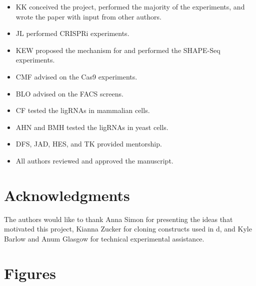 \documentclass[10pt,oneside]{article}
\begin{document}
\begin{itemize}
    \item KK conceived the project, performed the majority of the experiments, and wrote the paper with input from other authors.
    \item JL performed CRISPRi experiments.
    \item KEW proposed the mechanism for \ligrnaB{} and performed the SHAPE-Seq experiments.
    \item CMF advised on the \invitro{} Cas9 experiments.
    \item BLO advised on the FACS screens.
    \item CF tested the ligRNAs in mammalian cells.
    \item AHN and BMH tested the ligRNAs in yeast cells.
    \item DFS, JAD, HES, and TK provided mentorship.
	\item All authors reviewed and approved the manuscript. 
\end{itemize}

\section{Acknowledgments}

The authors would like to thank Anna Simon for presenting the ideas that motivated this project, Kianna Zucker for cloning constructs used in d, and Kyle Barlow and Anum Glasgow for technical experimental assistance.  

% 
% 

\section{Figures}


\end{document}
